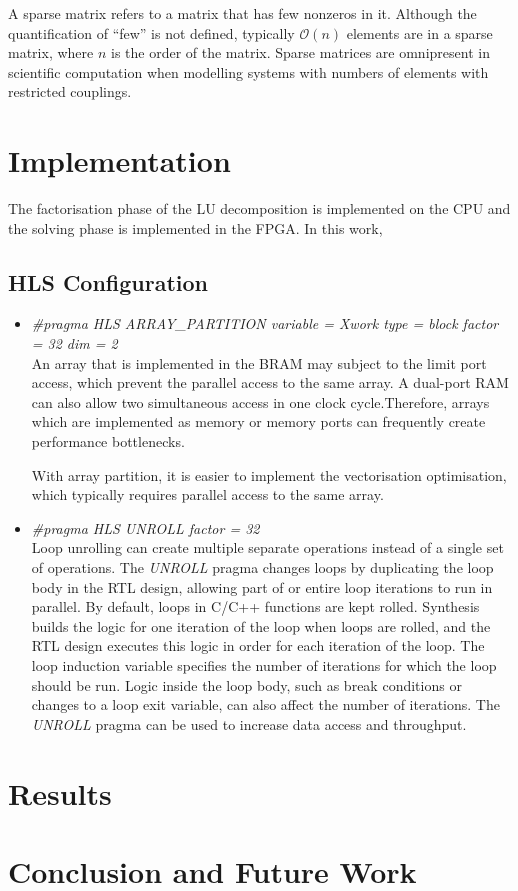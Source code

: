 \documentclass[11pt,a4paper]{article}
\begin{document}
A sparse matrix refers to a matrix that has few nonzeros in it. Although the quantification of ``few'' is not defined, typically \(\mathcal{O}(n)\) elements are in a sparse matrix, where \(n\) is the order of the matrix. Sparse matrices are omnipresent in scientific computation when modelling systems with numbers of elements with restricted couplings.

\section{Implementation}
The factorisation phase of the LU decomposition is implemented on the CPU and the solving phase is implemented in the FPGA. In this work,

\subsection{HLS Configuration}
\begin{itemize}
    \item \textit{#pragma HLS ARRAY_PARTITION variable = Xwork type = block factor = 32 dim = 2}\\
    An array that is implemented in the BRAM may subject to the limit port access, which prevent the parallel access to the same array. A dual-port RAM can also allow two simultaneous access in one clock cycle.Therefore, arrays which are implemented as memory or memory ports can frequently create performance bottlenecks.

    With array partition, it is easier to implement the vectorisation optimisation, which typically requires parallel access to the same array.

    \item \textit{#pragma HLS UNROLL factor = 32}\\
    Loop unrolling can create multiple separate operations instead of a single set of operations. The \emph{UNROLL} pragma changes loops by duplicating the loop body in the \acrshort{RTL} design, allowing part of or entire loop iterations to run in parallel. By default, loops in C/C++ functions are kept rolled.  Synthesis builds the logic for one iteration of the loop when loops are rolled, and the RTL design executes this logic in order for each iteration of the loop. The loop induction variable specifies the number of iterations for which the loop should be run. Logic inside the loop body, such as break conditions or changes to a loop exit variable, can also affect the number of iterations. The \emph{UNROLL} pragma can be used to increase data access and throughput.
\end{itemize}

\section{Results}


\section{Conclusion and Future Work}

\renewcommand*{\bibname}{References}

\begin{sloppypar}
  \relax
  \printbibliography[heading=bibintoc,title={References}]
\end{sloppypar}
\end{document}
